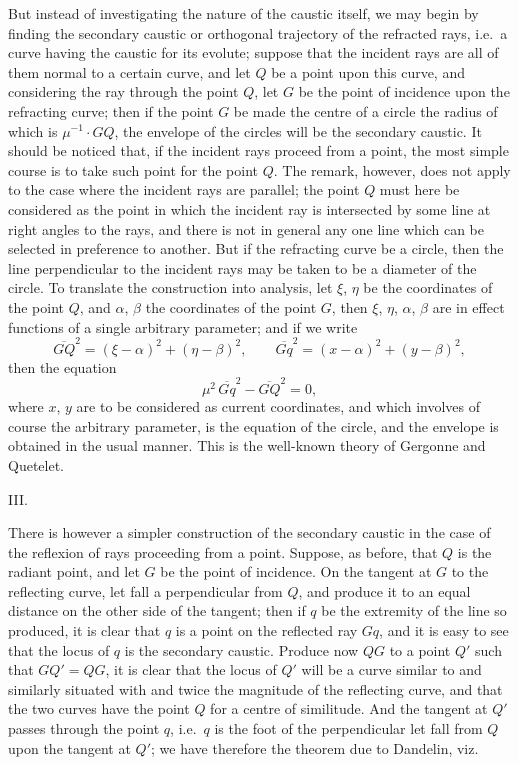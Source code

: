 \documentclass[11pt]{article}
\begin{document}
But instead of investigating the nature of the caustic itself, we may begin by finding the secondary caustic or orthogonal trajectory of the refracted rays, i.e.\ a curve having the caustic for its evolute; suppose that the incident rays are all of them normal to a certain curve, and let $Q$ be a point upon this curve, and considering the ray through the point $Q$, let $G$ be the point of incidence upon the refracting curve; then if the point $G$ be made the centre of a circle the radius of which is $\mu^{-1}\cdot GQ$, the envelope of the circles will be the secondary caustic. It should be noticed that, if the incident rays proceed from a point, the most simple course is to take such point for the point $Q$. The remark, however, does not apply to the case where the incident rays are parallel; the point $Q$ must here be considered as the point in which the incident ray is intersected by some line at right angles to the rays, and there is not in general any one line which can be selected in preference to another. But if the refracting curve be a circle, then the line perpendicular to the incident rays may be taken to be a diameter of the circle. To translate the construction into analysis, let $\xi$, $\eta$ be the coordinates of the point $Q$, and $\alpha$, $\beta$ the coordinates of the point $G$, then $\xi$, $\eta$, $\alpha$, $\beta$ are in effect functions of a single arbitrary parameter; and if we write
\[
\overline{GQ}^{2} = (\xi-\alpha)^{2} + (\eta-\beta)^{2},\qquad \overline{Gq}^{2} = (x-\alpha)^{2} + (y-\beta)^{2},
\]
then the equation
\[
\mu^{2}\,\overline{Gq}^{2} - \overline{GQ}^{2} = 0,
\]
where $x$, $y$ are to be considered as current coordinates, and which involves of course the arbitrary parameter, is the equation of the circle, and the envelope is obtained in the usual manner. This is the well-known theory of Gergonne and Quetelet.

\medskip
\begin{center}III.\end{center}

There is however a simpler construction of the secondary caustic in the case of the reflexion of rays proceeding from a point. Suppose, as before, that $Q$ is the radiant point, and let $G$ be the point of incidence. On the tangent at $G$ to the reflecting curve, let fall a perpendicular from $Q$, and produce it to an equal distance on the other side of the tangent; then if $q$ be the extremity of the line so produced, it is clear that $q$ is a point on the reflected ray $Gq$, and it is easy to see that the locus of $q$ is the secondary caustic. Produce now $QG$ to a point $Q'$ such that $GQ' = QG$, it is clear that the locus of $Q'$ will be a curve similar to and similarly situated with and twice the magnitude of the reflecting curve, and that the two curves have the point $Q$ for a centre of similitude. And the tangent at $Q'$ passes through the point $q$, i.e.\ $q$ is the foot of the perpendicular let fall from $Q$ upon the tangent at $Q'$; we have therefore the theorem due to Dandelin, viz.
\end{document}
